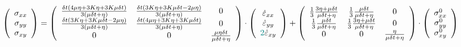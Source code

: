 \begin{mdframed}[backgroundcolor=blue!5]
{\small
\begin{equation}
\left(
\begin{array}{c}
\sigma_{xx}\\ 
\sigma_{yy}\\ 
\sigma_{xy} 
\end{array}
\right)
=
\left(
\begin{array}{ccc}
\frac{\delta t(4\mu \eta + 3K \eta+ 3K \mu\delta t)}{3(\mu \delta t + \eta)} &
\frac{\delta t(3K \eta+ 3K \mu\delta t - 2\mu \eta)}{3(\mu \delta t + \eta)} &
0 \\
\frac{\delta t(3K \eta+ 3K \mu\delta t  - 2\mu \eta)}{3(\mu \delta t + \eta)}&
\frac{\delta t(4\mu \eta + 3K \eta+ 3K \mu\delta t)}{3(\mu \delta t + \eta)} &
0  \\
0 & 0 & \frac{\mu \eta \delta t }{\mu \delta t + \eta}  \\
\end{array}
\right)
\cdot
\left(
\begin{array}{c}
\dot\varepsilon_{xx}\\ 
\dot\varepsilon_{yy}\\ 
{\color{teal}2}\dot\varepsilon_{xy} 
\end{array}
\right) 
+
\left(
\begin{array}{cccccc}
\frac13\frac{3\eta + \mu \delta t}{\mu\delta t+\eta} & 
\frac13\frac{\mu \delta t}{\mu\delta t+\eta} & 
0\\
\frac13\frac{\mu \delta t}{\mu\delta t+\eta} & 
\frac13\frac{3\eta + \mu \delta t}{\mu\delta t+\eta} & 
0\\
0 & 0 & \frac{ \eta}{\mu\delta t + \eta}  
\end{array}
\right)
\cdot
\left(
\begin{array}{c}
\sigma_{xx}^0\\ 
\sigma_{yy}^0\\ 
\sigma_{xy}^0 
\end{array}
\right) 
\label{eq_129_2D}
\end{equation}
}
\end{mdframed}

